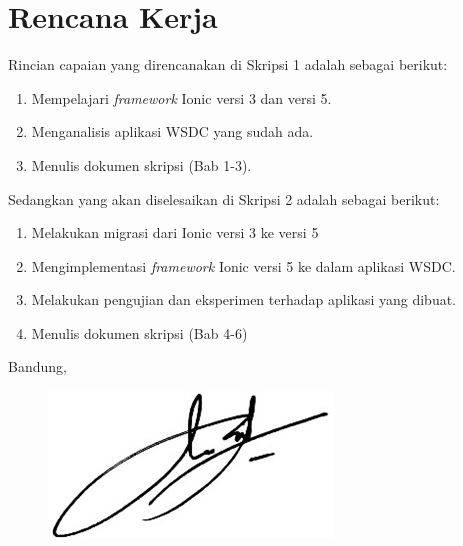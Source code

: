 \documentclass[a4paper,twoside]{article}
\begin{document}
\section{Rencana Kerja}
Rincian capaian yang direncanakan di Skripsi 1 adalah sebagai berikut:
\begin{enumerate}
\item Mempelajari {\it framework} Ionic versi 3 dan versi 5.
\item Menganalisis aplikasi WSDC yang sudah ada.
\item Menulis dokumen skripsi (Bab 1-3).
\end{enumerate}

Sedangkan yang akan diselesaikan di Skripsi 2 adalah sebagai berikut:
\begin{enumerate}
\item Melakukan migrasi dari Ionic versi 3 ke versi 5
\item Mengimplementasi {\it framework} Ionic versi 5 ke dalam aplikasi WSDC. 
\item Melakukan pengujian dan eksperimen terhadap aplikasi yang dibuat.
\item Menulis dokumen skripsi (Bab 4-6)
\end{enumerate}

\newpage

\vspace{1cm}
\centering Bandung, \tanggal\\
\vspace{0.5cm} 

\begin{figure}[H]
    \centering
    \includegraphics[scale=1]{TandaTangan.jpg}
    \label{fig:ionic-ttdrajasa}
\end{figure}

\nama \\ 
\vspace{1cm}
\end{document}
